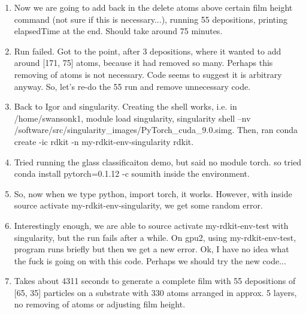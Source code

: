 \documentclass[12pt,reqno]{amsart}
\numberwithin{equation}{section}
\begin{document}
\begin{enumerate}
\item Now we are going to add back in the delete atoms above certain film height command (not sure if this is necessary...), running 55 depositions, printing elapsedTime at the end.  Should take around 75 minutes.  
\item Run failed.  Got to the point, after 3 depositions, where it wanted to add around [171, 75] atoms, because it had removed so many.  Perhaps this removing of atoms is not necessary.  Code seems to suggest it is arbitrary anyway.  So, let's re-do the 55 run and remove unnecessary code.  
\item Back to Igor and singularity.  Creating the shell works, i.e. in /home/swansonk1, module load singularity, singularity shell --nv /software/src/singularity\_images/PyTorch\_cuda\_9.0.simg.  Then, ran conda create -ic rdkit -n my-rdkit-env-singularity rdkit.  
\item Tried running the glass classificaiton demo, but said no module torch.  so tried conda install pytorch=0.1.12 -c soumith inside the environment.  
\item So, now when we type python, import torch, it works.  However, with inside source activate my-rdkit-env-singularity, we get some random error.
\item Interestingly enough, we are able to source activate my-rdkit-env-test with singularity, but the run fails after a while.  On gpu2, using my-rdkit-env-test, program runs briefly but then we get a new error.  Ok, I have no idea what the fuck is going on with this code.  Perhaps we should try the new code...  
\item Takes about 4311 seconds to generate a complete film with 55 depositions of [65, 35] particles on a substrate with 330 atoms arranged in approx. 5 layers, no removing of atoms or adjusting film height.  
\end{enumerate}
\end{document}

